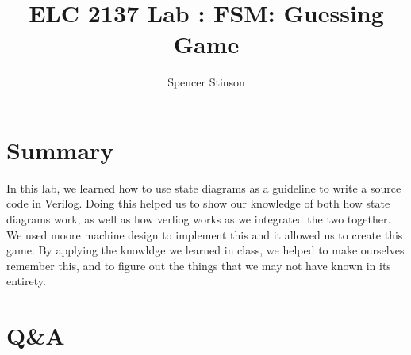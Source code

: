 \documentclass[11pt]{article}
\begin{document}
\title{ELC 2137 Lab : FSM: Guessing Game}
\author{Spencer Stinson}

\maketitle


\section*{Summary}

In this lab, we learned how to use state diagrams as a guideline to write a source code in Verilog. Doing this helped us to show our knowledge of both how state diagrams work, as well as how verliog works as we integrated the two together. We used moore machine design to implement this and it allowed us to create this game. By applying the knowldge we learned in class, we helped to make ourselves remember this, and to figure out the things that we may not have known in its entirety. 


\section*{Q\&A}
\end{document}

